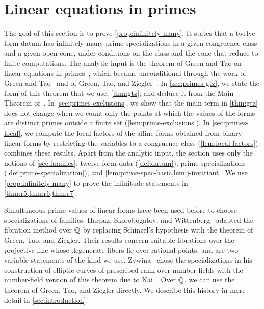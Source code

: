 \chapter{Linear equations in primes}\label{sec:primes}

The goal of this section is to prove \cref{prop:infinitely-many}. It states that a twelve-form datum has infinitely many prime specializations in a given congruence class and a given open cone, under conditions on the class and the cone that reduce to finite computations. The analytic input is the theorem of Green and Tao on linear equations in primes~\cite{GT2010}, which became unconditional through the work of Green and Tao~\cite{GT2012} and of Green, Tao, and Ziegler~\cite{GTZ2012}. In \cref{sec:primes-gtz}, we state the form of this theorem that we use, \cref{thm:gtz}, and deduce it from the Main Theorem of~\cite{GT2010}. In \cref{sec:primes-exclusions}, we show that the main term in \cref{thm:gtz} does not change when we count only the points at which the values of the forms are distinct primes outside a finite set (\cref{lem:prime-exclusions}). In \cref{sec:primes-local}, we compute the local factors of the affine forms obtained from binary linear forms by restricting the variables to a congruence class (\cref{lem:local-factors}).  combines these results. Apart from the analytic input, the section uses only the notions of \cref{sec:families}: twelve-form data (\cref{def:datum}), prime specializations (\cref{def:prime-specialization}), and \cref{lem:prime-spec-basic,lem:j-invariant}. We use \cref{prop:infinitely-many} to prove the infinitude statements in \cref{thm:r5,thm:r6,thm:r7}.

Simultaneous prime values of linear forms have been used before to choose specializations of families. Harpaz, Skorobogatov, and Wittenberg~\cite{HSW2014} adapted the fibration method over $\mathbb Q$ by replacing Schinzel's hypothesis with the theorem of Green, Tao, and Ziegler. Their results concern suitable fibrations over the projective line whose degenerate fibers lie over rational points, and \cite[Theorem~1.1 and Proposition~1.2]{HSW2014} are two-variable statements of the kind we use. Zywina~\cite[Proposition~5.9]{Zywina2026} chose the specializations in his construction of elliptic curves of prescribed rank over number fields with the number-field version of this theorem due to Kai~\cite[Proposition~13.2]{Kai}. Over $\mathbb Q$, we can use the theorem of Green, Tao, and Ziegler directly. We describe this history in more detail in \cref{sec:introduction}.

